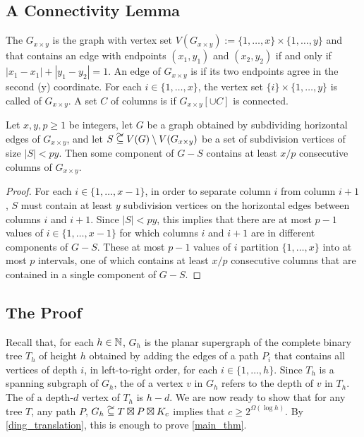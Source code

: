 \documentclass{patmorin}
\newcommand\subsetcong{\mathrel{\text{%
    \setbox0\hbox{$\subseteq$}%
    \rlap{\hbox to \wd0{\hss\hss\hss\raisebox{1.5\height}{$\sim$}\hss}}\box0
}}}
\renewcommand{\ge}{\geqslant}
\begin{document}
\subsection{A Connectivity Lemma}

The  $G_{x\times y}$ is the graph with vertex set $V(G_{x\times y}):=\{1,\ldots,x\}\times\{1,\ldots,y\}$ and that contains an edge with endpoints $(x_1,y_1)$ and $(x_2,y_2)$ if and only if $|x_1-x_1|+|y_1-y_2|=1$.  An edge of $G_{x\times y}$ is  if its two endpoints agree in the second (y) coordinate.  For each $i\in\{1,\ldots,x\}$, the vertex set $\{i\}\times\{1,\ldots,y\}$ is called  of $G_{x\times y}$.  A set $C$ of columns is  if $G_{x\times y}[\cup C]$ is connected.


\begin{lem}\label{grid_connectivity}
  Let $x,y,p\ge 1$ be integers, let $G$ be a graph obtained by subdividing horizontal edges of $G_{x\times y}$, and let $S\subsetcong V(G)\setminus V(G_{x\times y})$ be a set of subdivision vertices of size $|S|< py$.  Then some component of $G-S$ contains at least $x/p$ consecutive columns of $G_{x\times y}$.
\end{lem}

\begin{proof}
  For each $i\in\{1,\ldots,x-1\}$, in order to separate column $i$ from column $i+1$, $S$ must contain at least $y$ subdivision vertices on the horizontal edges between columns $i$ and $i+1$.  Since $|S|< py$, this implies that there are at most $p-1$ values of $i\in\{1,\ldots,x-1\}$ for which columns $i$ and $i+1$ are in different components of $G-S$. These at most $p-1$ values of $i$ partition $\{1,\ldots,x\}$ into at most $p$ intervals, one of which contains at least $x/p$ consecutive columns that are contained in a single component of $G-S$.
\end{proof}

\subsection{The Proof}




Recall that, for each $h\in\mathbb{N}$, $G_{h}$ is the planar supergraph of the complete binary tree $T_h$ of height $h$ obtained by adding the edges of a path $P_i$ that contains all vertices of depth $i$, in left-to-right order, for each $i\in\{1,\ldots,h\}$.   Since $T_h$ is a spanning subgraph of $G_h$, the  of a vertex $v$ in $G_h$ refers to the depth of $v$ in $T_h$.  The  of a depth-$d$ vertex of $T_h$ is $h-d$.  We are now ready to show that for any tree $T$, any path $P$, $G_{h}\subsetcong T\boxtimes P\boxtimes K_c$ implies that $c\ge 2^{\Omega(\log h)}$.  By \cref{ding_translation}, this is enough to prove \cref{main_thm}.  
\end{document}
